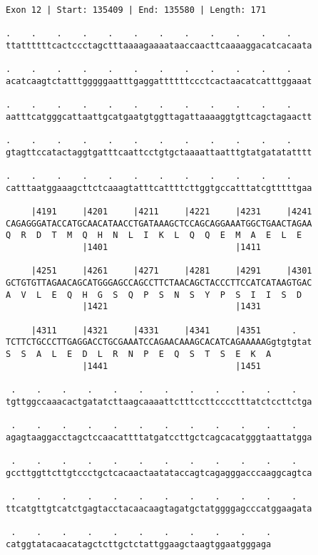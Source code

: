 \documentclass{article}
\begin{document}
\begin{Verbatim}
Exon 12 | Start: 135409 | End: 135580 | Length: 171
 
.    .    .    .    .    .    .    .    .    .    .    .    
ttattttttcactccctagctttaaaagaaaataaccaacttcaaaaggacatcacaata
  
.    .    .    .    .    .    .    .    .    .    .    .    
acatcaagtctatttgggggaatttgaggattttttccctcactaacatcatttggaaat
  
.    .    .    .    .    .    .    .    .    .    .    .    
aatttcatgggcattaattgcatgaatgtggttagattaaaaggtgttcagctagaactt
  
.    .    .    .    .    .    .    .    .    .    .    .    
gtagttccatactaggtgatttcaattcctgtgctaaaattaatttgtatgatatatttt
  
.    .    .    .    .    .    .    .    .    .    .    .    
catttaatggaaagcttctcaaagtatttcattttcttggtgccatttatcgtttttgaa
  
     |4191     |4201     |4211     |4221     |4231     |4241
CAGAGGGATACCATGCAACATAACCTGATAAAGCTCCAGCAGGAAATGGCTGAACTAGAA
Q  R  D  T  M  Q  H  N  L  I  K  L  Q  Q  E  M  A  E  L  E  
               |1401                         |1411          
  
     |4251     |4261     |4271     |4281     |4291     |4301
GCTGTGTTAGAACAGCATGGGAGCCAGCCTTCTAACAGCTACCCTTCCATCATAAGTGAC
A  V  L  E  Q  H  G  S  Q  P  S  N  S  Y  P  S  I  I  S  D  
               |1421                         |1431          
  
     |4311     |4321     |4331     |4341     |4351      .   
TCTTCTGCCCTTGAGGACCTGCGAAATCCAGAACAAAGCACATCAGAAAAAGgtgtgtat
S  S  A  L  E  D  L  R  N  P  E  Q  S  T  S  E  K  A        
               |1441                         |1451          
  
 .    .    .    .    .    .    .    .    .    .    .    .   
tgttggccaaacactgatatcttaagcaaaattctttccttcccctttatctccttctga
  
 .    .    .    .    .    .    .    .    .    .    .    .   
agagtaaggacctagctccaacattttatgatccttgctcagcacatgggtaattatgga
  
 .    .    .    .    .    .    .    .    .    .    .    .   
gccttggttcttgtccctgctcacaactaatataccagtcagagggacccaaggcagtca
  
 .    .    .    .    .    .    .    .    .    .    .    .   
ttcatgttgtcatctgagtacctacaacaagtagatgctatggggagcccatggaagata
  
 .    .    .    .    .    .    .    .    .    .    .
catggtatacaacatagctcttgctctattggaagctaagtggaatgggaga
\end{Verbatim}
\end{document}
